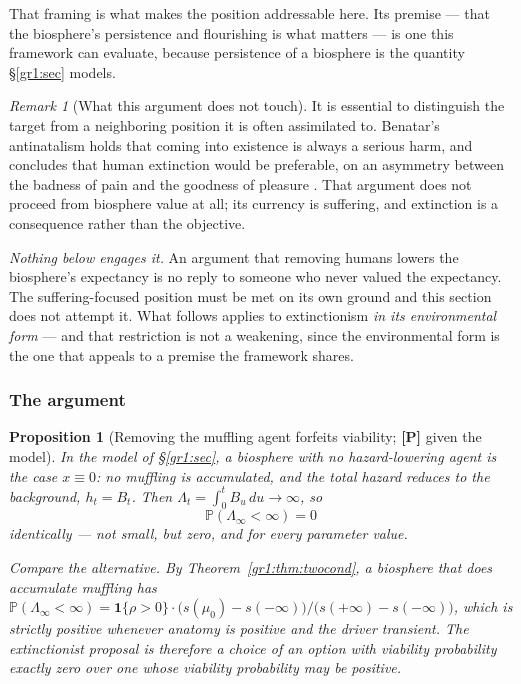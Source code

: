 \documentclass[11pt]{article}
\numberwithin{equation}{section}
\theoremstyle{plain}
\newtheorem{proposition}[theorem]{Proposition}
\theoremstyle{definition}
\theoremstyle{remark}
\newtheorem{remark}[theorem]{Remark}
\newcommand{\PP}{\mathbb{P}}
\newcommand{\one}{\mathbf{1}}
\begin{document}
That framing is what makes the position addressable here. Its premise
--- that the biosphere's persistence and flourishing is what matters ---
is one this framework can evaluate, because persistence of a biosphere
is the quantity \S\ref{gr1:sec} models.

\begin{remark}[What this argument does not touch]\label{hr:rem:scope}
It is essential to distinguish the target from a neighboring position
it is often assimilated to. Benatar's antinatalism holds that coming
into existence is always a serious harm, and concludes that human
extinction would be preferable, on an asymmetry between the badness of
pain and the goodness of pleasure \cite{Benatar06}. That argument does
not proceed from biosphere value at all; its currency is suffering, and
extinction is a consequence rather than the objective.

\emph{Nothing below engages it.} An argument that removing humans lowers
the biosphere's expectancy is no reply to someone who never valued the
expectancy. The suffering-focused position must be met on its own ground
and this section does not attempt it. What follows applies to
extinctionism \emph{in its environmental form} --- and that restriction
is not a weakening, since the environmental form is the one that appeals
to a premise the framework shares.
\end{remark}

\subsubsection{The argument}\label{hr:subsub:extinctionargument}

\begin{proposition}[Removing the muffling agent forfeits viability;
\textbf{[P]} given the model]\label{hr:prop:extinction}
In the model of \S\ref{gr1:sec}, a biosphere with no hazard-lowering
agent is the case $x\equiv0$: no muffling is accumulated, and the total
hazard reduces to the background, $h_t=B_t$. Then
$\Lambda_t=\int_0^t B_u\,du\to\infty$, so
\[
\PP(\Lambda_\infty<\infty)=0
\]
identically --- not small, but zero, and for every parameter value.

Compare the alternative. By Theorem~\ref{gr1:thm:twocond}, a biosphere
that does accumulate muffling has
$\PP(\Lambda_\infty<\infty)=\one\{\rho>0\}\cdot
\bigl(s(\mu_0)-s(-\infty)\bigr)/\bigl(s(+\infty)-s(-\infty)\bigr)$,
which is strictly positive whenever anatomy is positive and the driver
transient. The extinctionist proposal is therefore a choice of an option
with viability probability exactly zero over one whose viability
probability may be positive.
\end{proposition}
\end{document}

